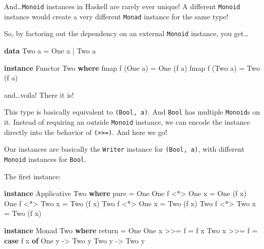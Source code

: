 \documentclass[]{article}
\newenvironment{Shaded}{}{}
\newcommand{\DataTypeTok}[1]{\textcolor[rgb]{0.56,0.13,0.00}{#1}}
\newcommand{\FunctionTok}[1]{\textcolor[rgb]{0.02,0.16,0.49}{#1}}
\newcommand{\KeywordTok}[1]{\textcolor[rgb]{0.00,0.44,0.13}{\textbf{#1}}}
\newcommand{\NormalTok}[1]{#1}
\newcommand{\OtherTok}[1]{\textcolor[rgb]{0.00,0.44,0.13}{#1}}
\begin{document}
And\ldots{}\texttt{Monoid} instances in Haskell are rarely ever unique! A
different \texttt{Monoid} instance would create a very different \texttt{Monad}
instance for the same type!

So, by factoring out the dependency on an external \texttt{Monoid} instance, you
get\ldots{}

\begin{Shaded}
\begin{Highlighting}[]
\KeywordTok{data} \DataTypeTok{Two}\NormalTok{ a }\FunctionTok{=} \DataTypeTok{One}\NormalTok{ a }\FunctionTok{|} \DataTypeTok{Two}\NormalTok{ a}

\KeywordTok{instance} \DataTypeTok{Functor} \DataTypeTok{Two} \KeywordTok{where}
\NormalTok{    fmap f (}\DataTypeTok{One}\NormalTok{ a) }\FunctionTok{=} \DataTypeTok{One}\NormalTok{ (f a)}
\NormalTok{    fmap f (}\DataTypeTok{Two}\NormalTok{ a) }\FunctionTok{=} \DataTypeTok{Two}\NormalTok{ (f a)}
\end{Highlighting}
\end{Shaded}

and\ldots{}voila! There it is!

This type is basically equivalent to \texttt{(Bool,\ a)}. And \texttt{Bool} has
multiple \texttt{Monoid}s on it. Instead of requiring an outside \texttt{Monoid}
instance, we can encode the instance directly into the behavior of
\texttt{(\textgreater{}\textgreater{}=)}. And here we go!

Our instances are basically the \texttt{Writer} instance for
\texttt{(Bool,\ a)}, with different \texttt{Monoid} instances for \texttt{Bool}.

The first instance:

\begin{Shaded}
\begin{Highlighting}[]
\KeywordTok{instance} \DataTypeTok{Applicative} \DataTypeTok{Two} \KeywordTok{where}
\NormalTok{    pure }\FunctionTok{=} \DataTypeTok{One}
    \DataTypeTok{One}\NormalTok{ f }\FunctionTok{<*>} \DataTypeTok{One}\NormalTok{ x }\FunctionTok{=} \DataTypeTok{One}\NormalTok{ (f x)}
    \DataTypeTok{One}\NormalTok{ f }\FunctionTok{<*>} \DataTypeTok{Two}\NormalTok{ x }\FunctionTok{=} \DataTypeTok{Two}\NormalTok{ (f x)}
    \DataTypeTok{Two}\NormalTok{ f }\FunctionTok{<*>} \DataTypeTok{One}\NormalTok{ x }\FunctionTok{=} \DataTypeTok{Two}\NormalTok{ (f x)}
    \DataTypeTok{Two}\NormalTok{ f }\FunctionTok{<*>} \DataTypeTok{Two}\NormalTok{ x }\FunctionTok{=} \DataTypeTok{Two}\NormalTok{ (f x)}

\KeywordTok{instance} \DataTypeTok{Monad} \DataTypeTok{Two} \KeywordTok{where}
\NormalTok{    return }\FunctionTok{=} \DataTypeTok{One}
    \DataTypeTok{One}\NormalTok{ x }\FunctionTok{>>=}\NormalTok{ f }\FunctionTok{=}\NormalTok{ f x}
    \DataTypeTok{Two}\NormalTok{ x }\FunctionTok{>>=}\NormalTok{ f }\FunctionTok{=} \KeywordTok{case}\NormalTok{ f x }\KeywordTok{of}
                    \DataTypeTok{One}\NormalTok{ y }\OtherTok{->} \DataTypeTok{Two}\NormalTok{ y}
                    \DataTypeTok{Two}\NormalTok{ y }\OtherTok{->} \DataTypeTok{Two}\NormalTok{ y}
\end{Highlighting}
\end{Shaded}
\end{document}
